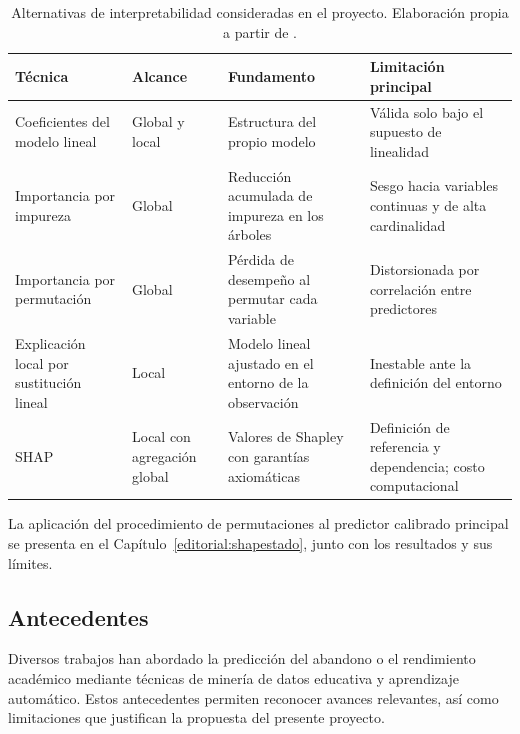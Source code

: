 \begin{table}[htbp]
\centering
\caption[Alternativas de interpretabilidad consideradas en el proyecto.]{Alternativas de interpretabilidad consideradas en el proyecto. Elaboración propia a partir de \cite{breiman2001,ribeiro2016,lundberg2017,lundberg2020,rudin2019}.}
\label{tab:interpretabilidad}
\small
\begin{tabular}{p{} p{} p{} p{}}
\hline
\textbf{Técnica} & \textbf{Alcance} & \textbf{Fundamento} & \textbf{Limitación principal} \\
\hline
Coeficientes del modelo lineal & Global y local & Estructura del propio modelo & Válida solo bajo el supuesto de linealidad \\
Importancia por impureza & Global & Reducción acumulada de impureza en los árboles & Sesgo hacia variables continuas y de alta cardinalidad \\
Importancia por permutación & Global & Pérdida de desempeño al permutar cada variable & Distorsionada por correlación entre predictores \\
Explicación local por sustitución lineal & Local & Modelo lineal ajustado en el entorno de la observación & Inestable ante la definición del entorno \\
SHAP & Local con agregación global & Valores de Shapley con garantías axiomáticas & Definición de referencia y dependencia; costo computacional \\
\hline
\end{tabular}
\end{table}

La aplicación del procedimiento de permutaciones al predictor calibrado principal se presenta en el Capítulo~\ref{editorial:shapestado}, junto con los resultados y sus límites.

\subsection{Antecedentes}

Diversos trabajos han abordado la predicción del abandono o el rendimiento académico mediante técnicas de minería de datos educativa y aprendizaje automático. Estos antecedentes permiten reconocer avances relevantes, así como limitaciones que justifican la propuesta del presente proyecto.

